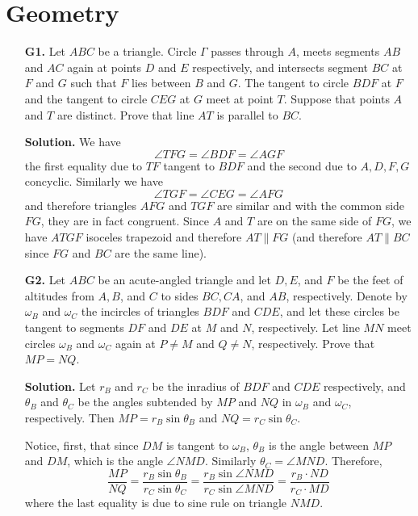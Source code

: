 \documentclass[11pt,a4paper]{article}
\begin{document}
\section*{Geometry}
\begin{enumerate}
	\item [\textbf{G1.}] Let $ABC$ be a triangle. Circle $\Gamma$ passes through $A$, meets segments $AB$ and $AC$ again at points $D$ and $E$ respectively, and intersects segment $BC$ at $F$ and $G$ such that $F$ lies between $B$ and $G$. The tangent to circle $BDF$ at $F$ and the tangent to circle $CEG$ at $G$ meet at point $T$. Suppose that points $A$ and $T$ are distinct. Prove that line $AT$ is parallel to $BC$.
	
	\textbf{Solution.} We have 
	\[
	\angle TFG =\angle BDF = \angle AGF
	\]
	the first equality due to $TF$ tangent to $BDF$ and the second due to $A, D, F, G$ concyclic. Similarly we have 
	\[
	\angle TGF = \angle CEG = \angle AFG
	\]
	and therefore triangles $AFG$ and $TGF$ are similar and with the common side $FG$, they are in fact congruent. Since $A$ and $T$ are on the same side of $FG$, we have $ATGF$ isoceles trapezoid and therefore $AT\parallel FG$ (and therefore $AT\parallel BC$ since $FG$ and $BC$ are the same line).
	
	
	\item [\textbf{G2.}] Let $ABC$ be an acute-angled triangle and let $D, E$, and $F$ be the feet of altitudes from $A, B$, and $C$ to sides $BC, CA$, and $AB$, respectively. Denote by $\omega_B$ and $\omega_C$ the incircles of triangles $BDF$ and $CDE$, and let these circles be tangent to segments $DF$ and $DE$ at $M$ and $N$, respectively. Let line $MN$ meet circles $\omega_B$ and $\omega_C$ again at $P \ne M$ and $Q \ne N$, respectively. Prove that $MP = NQ$.
	
	\textbf{Solution.} Let $r_B$ and $r_C$ be the inradius of $BDF$ and $CDE$ respectively, and $\theta_B$ and $\theta_C$ be the angles subtended by $MP$ and $NQ$ in $\omega_B$ and $\omega_C$, respectively. Then $MP=r_B\sin \theta_B$ and $NQ=r_C\sin\theta_C$. 
	
	Notice, first, that since $DM$ is tangent to $\omega_B$, $\theta_B$ is the angle between $MP$ and $DM$, which is the angle $\angle NMD$. Similarly $\theta_C=\angle MND$. Therefore, 
	\[
	\frac{MP}{NQ}=\frac{r_B\sin \theta_B}{r_C\sin\theta_C}
	=\frac{r_B\sin \angle NMD}{r_C\sin\angle MND}
	=\frac{r_B\cdot ND}{r_C\cdot MD}
	\]
	where the last equality is due to sine rule on triangle $NMD$. 
	

\end{enumerate}
\end{document}
